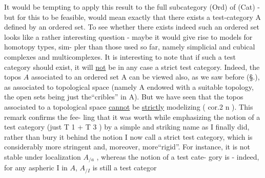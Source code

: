 It would be tempting to apply this result to the full subcategory
(Ord) of (Cat) - but for this to be feasible, would mean exactly that
there exists a test-category A defined by an ordered set. To see whether
there exists indeed such an ordered set looks like a rather interesting
question - maybe it would give rise to  models for homotopy types, sim-
pler than those used so far, namely simplicial and cubical complexes and
multicomplexes. It is interesting to note that if such a test category
should exist, it will \uline{not} be in any case a strict test category. Indeed,
the topos $A\hat{}$ associated to an ordered set A can be viewed also, as we saw
before (\S.), as associated to   topological space (namely A endowed
with a suitable topology, the open sets being just the``cribles'' in A).
But we have seen that the topos associated to a topological space \uline{cannot}
be \uline{strictly} modelizing ( cor.2 n ). \hand{$\rfloor$} This remark confirms the fee-
ling that it was worth while emphasizing the notion of a test category
 (just T 1 + T 3 ) by a simple and striking name as I finally did, rather
than bury it behind the notion I now call a strict test category, which
is considerably more stringent and, moreover, more``rigid''. For instance,
it is not stable under localization $A_{/a}$ , whereas the notion of a test cate-
gory is - indeed, for any aspheric I in $A\hat{}$, $A_{/I}$ is still a test categor
